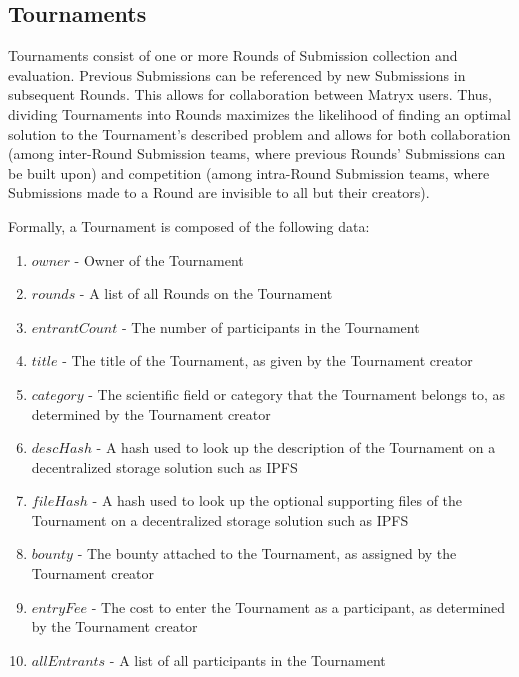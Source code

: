 \documentclass[a4paper, 10pt, conference]{ieeeconf}      %
\begin{document}
\subsection{Tournaments}\label{Tournaments}

Tournaments consist of one or more Rounds of Submission collection and evaluation. Previous Submissions can be referenced by new Submissions in subsequent Rounds. This allows for collaboration between Matryx users.
Thus, dividing Tournaments into Rounds maximizes the likelihood of finding an optimal solution to the Tournament's described problem and allows for both collaboration (among inter-Round Submission teams, where previous Rounds' Submissions can be built upon) and competition (among intra-Round Submission teams, where Submissions made to a Round are invisible to all but their creators).

Formally, a Tournament is composed of the following data:
\begin{enumerate}
\item $owner$ - Owner of the Tournament
\item $rounds$ - A list of all Rounds on the Tournament
\item $entrantCount$ - The number of participants in the Tournament 
\item $title$ - The title of the Tournament, as given by the Tournament creator
\item $category$ - The scientific field or category that the Tournament belongs to, as determined by the Tournament creator
\item $descHash$ - A hash used to look up the description of the Tournament on a decentralized storage solution such as IPFS
\item $fileHash$ - A hash used to look up the optional supporting files of the Tournament on a decentralized storage solution such as IPFS
\item $bounty$ - The bounty attached to the Tournament, as assigned by the Tournament creator
\item $entryFee$ - The cost to enter the Tournament as a participant, as determined by the Tournament creator
\item $allEntrants$ - A list of all participants in the Tournament
\end{enumerate}
\end{document}
